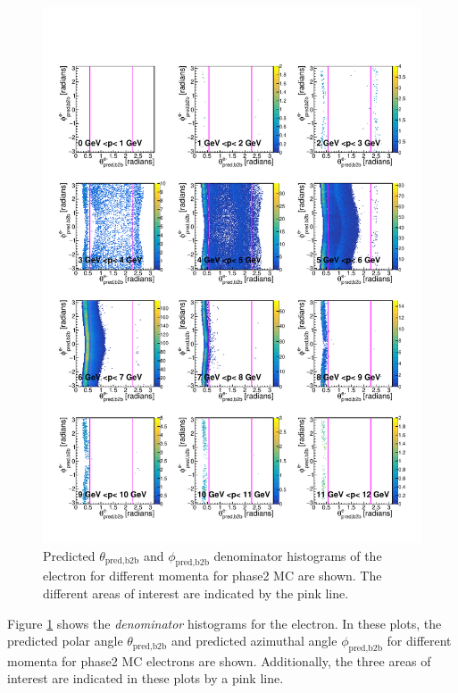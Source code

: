 \documentclass[a4paper,11pt,twosided,final,german,openbib,pdftex,listof=totoc,bibliography=totoc]{scrbook}
\begin{document}
\begin{figure}[h!]
	\includegraphics[width=\textwidth]{Plots/master/RTPMemD_MC.pdf}
	\caption[Denominator $\theta_{\textrm{pred,b2b}}$-$\phi_{\textrm{pred,b2b}}$ Electron Momentum MC]{Predicted $\theta_{\textrm{pred,b2b}}$ and $\phi_{\textrm{pred,b2b}}$ denominator histograms of the electron for different momenta for phase2 MC are shown. The different areas of interest are indicated by the pink line.}
	\label{plt:RTPMemD_MC}
\end{figure}

Figure \ref{plt:RTPMemD_MC} shows the \textit{denominator} histograms for the electron. In these plots, the predicted polar angle $\theta_{\textrm{pred,b2b}}$ and predicted azimuthal angle $\phi_{\textrm{pred,b2b}}$ for different momenta for phase2 MC electrons are shown. Additionally, the three areas of interest are indicated in these plots by a pink line. 
\end{document}
